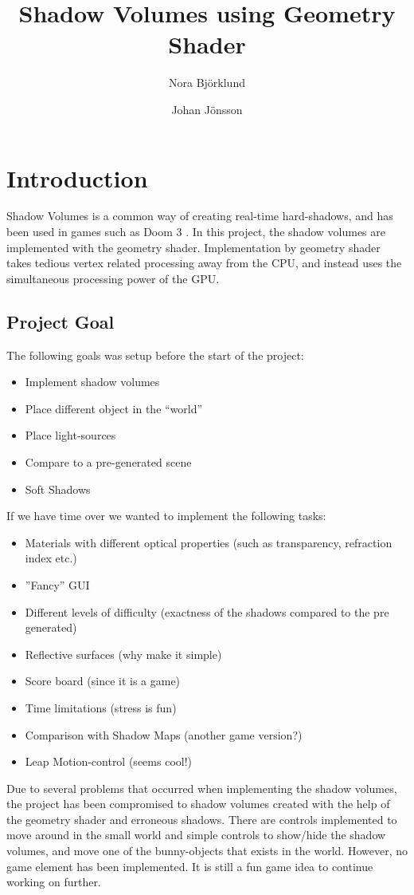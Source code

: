 \documentclass[a4paper, 12pt]{article}
\title{Shadow Volumes using Geometry Shader}
\author{Nora Björklund \and Johan Jönsson}
\begin{document}
\maketitle
\tableofcontents
\newpage
\section{Introduction}
Shadow Volumes is a common way of creating real-time hard-shadows, and has been used in games such as Doom 3 \cite{gpug1}. In this project, the shadow volumes are implemented with the geometry shader. Implementation by geometry shader takes tedious vertex related processing away from the CPU, and instead uses the simultaneous processing power of the GPU.
\subsection{Project Goal}
The following goals was setup before the start of the project:
\begin{itemize}
\item Implement shadow volumes
\item Place different object in the ``world''
\item Place light-sources
\item Compare to a pre-generated scene 
\item Soft Shadows
\end{itemize}
If we have time over we wanted to implement the following tasks:
\begin{itemize}
\item Materials with different optical properties (such as transparency,
refraction index etc.)
\item  ”Fancy” GUI
\item  Different levels of difficulty (exactness of the shadows compared to the pre generated)
\item  Reflective surfaces (why make it simple)
\item  Score board (since it is a game)
\item  Time limitations (stress is fun)
\item  Comparison with Shadow Maps (another game version?)
\item  Leap Motion-control (seems cool!)
\end{itemize}

Due to several problems that occurred when implementing the shadow volumes, the project has been compromised to shadow volumes created with the help of the geometry shader and erroneous shadows. There are controls implemented to move around in the small world and simple controls to show/hide the shadow volumes, and move one of the bunny-objects that exists in the world. However, no game element has been implemented. It is still a fun game idea to continue working on further.
\end{document}
